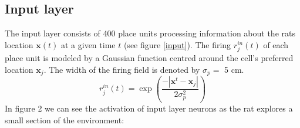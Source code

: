 \documentclass[a4paper, 12pt]{article}
\begin{document}
\subsection{Input layer}
The input layer consists of 400 place units processing information about the rats location $\boldsymbol{x}(t)$ at a given time $t$ (see figure \ref{input}). The firing $r_j^{in}(t)$ of each place unit is modeled by a Gaussian function centred around the cell's preferred location $\boldsymbol{x}_j$. The width of the firing field is denoted by $\sigma_p=$ 5 cm. 
	\begin{equation}
	r_j^{in}(t)=\exp\left(\frac{-|\boldsymbol{x}^t-\boldsymbol{x}_j|}{2\sigma_p^2}\right)
	\end{equation}
In figure 2 we can see the activation of input layer neurons as the rat explores a small section of the environment:  
\end{document}
